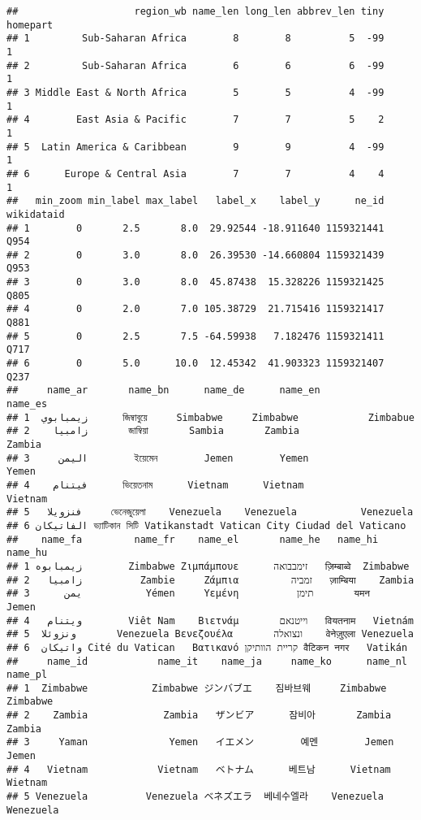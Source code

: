\documentclass[
]{article}
\begin{document}
\begin{verbatim}
##                    region_wb name_len long_len abbrev_len tiny homepart
## 1         Sub-Saharan Africa        8        8          5  -99        1
## 2         Sub-Saharan Africa        6        6          6  -99        1
## 3 Middle East & North Africa        5        5          4  -99        1
## 4        East Asia & Pacific        7        7          5    2        1
## 5  Latin America & Caribbean        9        9          4  -99        1
## 6      Europe & Central Asia        7        7          4    4        1
##   min_zoom min_label max_label   label_x    label_y      ne_id wikidataid
## 1        0       2.5       8.0  29.92544 -18.911640 1159321441       Q954
## 2        0       3.0       8.0  26.39530 -14.660804 1159321439       Q953
## 3        0       3.0       8.0  45.87438  15.328226 1159321425       Q805
## 4        0       2.0       7.0 105.38729  21.715416 1159321417       Q881
## 5        0       2.5       7.5 -64.59938   7.182476 1159321411       Q717
## 6        0       5.0      10.0  12.45342  41.903323 1159321407       Q237
##     name_ar       name_bn      name_de      name_en             name_es
## 1  زيمبابوي      জিম্বাবুয়ে     Simbabwe     Zimbabwe            Zimbabue
## 2    زامبيا       জাম্বিয়া       Sambia       Zambia              Zambia
## 3     اليمن        ইয়েমেন        Jemen        Yemen               Yemen
## 4    فيتنام      ভিয়েতনাম      Vietnam      Vietnam             Vietnam
## 5   فنزويلا     ভেনেজুয়েলা    Venezuela    Venezuela           Venezuela
## 6 الفاتيكان ভ্যাটিকান সিটি Vatikanstadt Vatican City Ciudad del Vaticano
##    name_fa         name_fr    name_el       name_he   name_hi   name_hu
## 1 زیمبابوه        Zimbabwe Ζιμπάμπουε      זימבבואה   ज़िम्बाब्वे  Zimbabwe
## 2   زامبیا          Zambie     Ζάμπια         זמביה   ज़ाम्बिया    Zambia
## 3      یمن           Yémen     Υεμένη          תימן       यमन     Jemen
## 4   ویتنام        Viêt Nam    Βιετνάμ       וייטנאם   वियतनाम   Vietnám
## 5  ونزوئلا       Venezuela Βενεζουέλα       ונצואלה    वेनेज़ुएला Venezuela
## 6  واتیکان Cité du Vatican   Βατικανό קריית הוותיקן वैटिकन नगर   Vatikán
##     name_id            name_it    name_ja     name_ko      name_nl   name_pl
## 1  Zimbabwe           Zimbabwe ジンバブエ    짐바브웨     Zimbabwe  Zimbabwe
## 2    Zambia             Zambia   ザンビア      잠비아       Zambia    Zambia
## 3     Yaman              Yemen   イエメン        예멘        Jemen     Jemen
## 4   Vietnam            Vietnam   ベトナム      베트남      Vietnam   Wietnam
## 5 Venezuela          Venezuela ベネズエラ  베네수엘라    Venezuela Wenezuela

\end{verbatim}
\end{document}
